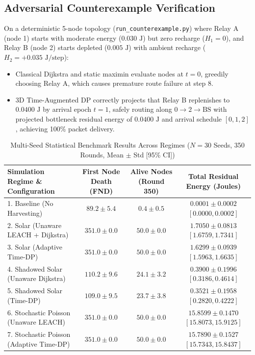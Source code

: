 \documentclass[journal]{IEEEtran}
\begin{document}
\subsection{Adversarial Counterexample Verification}
On a deterministic 5-node topology (\texttt{run\_counterexample.py}) where Relay A (node 1) starts with moderate energy ($0.030\text{ J}$) but zero recharge ($H_1 = 0$), and Relay B (node 2) starts depleted ($0.005\text{ J}$) with ambient recharge ($H_2 = +0.035\text{ J/step}$):
\begin{itemize}
    \item Classical Dijkstra and static maximin evaluate nodes at $t=0$, greedily choosing Relay A, which causes premature route failure at step 8.
    \item 3D Time-Augmented DP correctly projects that Relay B replenishes to $0.0400\text{ J}$ by arrival epoch $t=1$, safely routing along $0 \to 2 \to \text{BS}$ with projected bottleneck residual energy of $0.0400\text{ J}$ and arrival schedule $[0, 1, 2]$, achieving 100\% packet delivery.
\end{itemize}

\begin{table}[!t]
\caption{Multi-Seed Statistical Benchmark Results Across Regimes ($N = 30$ Seeds, 350 Rounds, Mean $\pm$ Std [95\% CI])}
\label{tab:multi_seed}
\centering
\begin{tabular}{@{}lccc@{}}
\toprule
\textbf{Simulation Regime \& Configuration} & \textbf{First Node Death (FND)} & \textbf{Alive Nodes (Round 350)} & \textbf{Total Residual Energy (Joules)} \\
\midrule
1. Baseline (No Harvesting) & $89.2 \pm 5.4$ & $0.4 \pm 0.5$ & $0.0001 \pm 0.0002$ $[0.0000, 0.0002]$ \\
2. Solar (Unaware LEACH + Dijkstra) & $351.0 \pm 0.0$ & $50.0 \pm 0.0$ & $\mathbf{1.7050 \pm 0.0813}$ $[1.6759, 1.7341]$ \\
3. Solar (Adaptive Time-DP) & $351.0 \pm 0.0$ & $50.0 \pm 0.0$ & $1.6299 \pm 0.0939$ $[1.5963, 1.6635]$ \\
4. Shadowed Solar (Unaware Dijkstra) & $\mathbf{110.2 \pm 9.6}$ & $\mathbf{24.1 \pm 3.2}$ & $\mathbf{0.3900 \pm 0.1996}$ $[0.3186, 0.4614]$ \\
5. Shadowed Solar (Time-DP) & $109.0 \pm 9.5$ & $23.7 \pm 3.8$ & $0.3521 \pm 0.1958$ $[0.2820, 0.4222]$ \\
6. Stochastic Poisson (Unaware LEACH) & $351.0 \pm 0.0$ & $50.0 \pm 0.0$ & $\mathbf{15.8599 \pm 0.1470}$ $[15.8073, 15.9125]$ \\
7. Stochastic Poisson (Adaptive Time-DP) & $351.0 \pm 0.0$ & $50.0 \pm 0.0$ & $15.7890 \pm 0.1527$ $[15.7343, 15.8437]$ \\
\bottomrule
\end{tabular}
\end{table}
\end{document}
